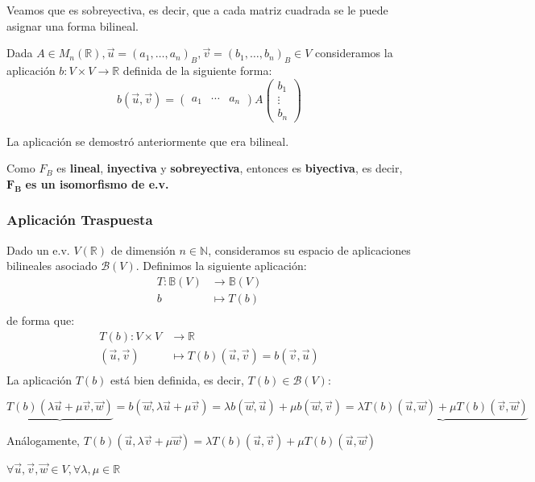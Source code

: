 \documentclass[x11names,table]{report}
\begin{document}
Veamos que es sobreyectiva, es decir, que a cada matriz cuadrada se le puede asignar una forma bilineal.

Dada $A\in M_n(\mathbb{R}), \vec{u}=(a_1,\dots,a_n)_B, \vec{v}=(b_1,\dots,b_n)_B \in V$ consideramos la aplicación $b:V\times V\longrightarrow\mathbb{R}$ definida de la siguiente forma:
\[
b(\vec{u},\vec{v})=\begin{pmatrix}
a_1 & \cdots & a_n
\end{pmatrix}A\begin{pmatrix}
b_1 \\ \vdots \\ b_n
\end{pmatrix}
\]

La aplicación se demostró anteriormente que era bilineal.

Como $F_B$ es \textbf{lineal}, \textbf{inyectiva} y \textbf{sobreyectiva}, entonces es \textbf{biyectiva}, es decir, $\mathbf{F_B}$ \textbf{es un isomorfismo de e.v.}

\subsubsection*{Aplicación Traspuesta}
Dado un e.v. $V(\mathbb{R})$ de dimensión $n\in\mathbb{N}$, consideramos su espacio de aplicaciones bilineales asociado $\mathcal{B}(V)$. Definimos la siguiente aplicación:
\begin{align*}
T:\mathbb{B}(V)&\longrightarrow\mathbb{B}(V)\\
b&\longmapsto T(b)\\
\end{align*}
de forma que:
\begin{align*}
T(b):V\times V &\longrightarrow\mathbb{R}\\
(\vec{u},\vec{v})&\longmapsto T(b)(\vec{u},\vec{v})=b(\vec{v},\vec{u})\\
\end{align*}
La aplicación $T(b)$ está bien definida, es decir, $T(b)\in \mathcal{B}(V)$:

$\underbrace{T(b)(\lambda \vec{u}+\mu \vec{v},\vec{w})}=b(\vec{w},\lambda \vec{u}+\mu \vec{v})=\lambda b(\vec{w},\vec{u})+\mu b(\vec{w},\vec{v})=\underbrace{\lambda T(b)(\vec{u},\vec{w})+\mu T(b)(\vec{v},\vec{w})}$

Análogamente, $T(b)(\vec{u},\lambda\vec{v}+\mu\vec{w})=\lambda T(b)(\vec{u},\vec{v})+\mu T(b)(\vec{u},\vec{w})$

$\forall \vec{u},\vec{v},\vec{w}\in V, \forall \lambda,\mu\in\mathbb{R}$
\end{document}

